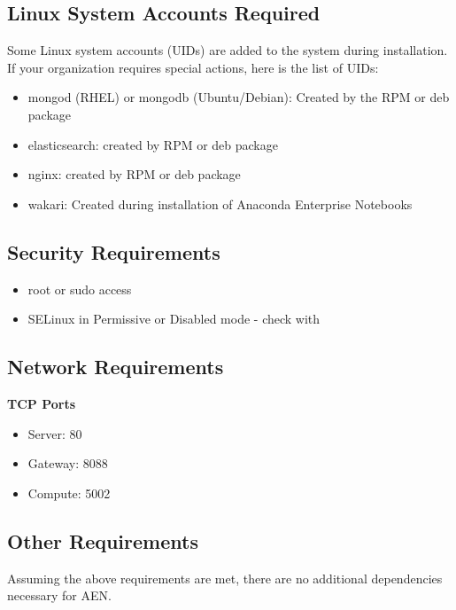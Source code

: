 \documentclass[letterpaper,10pt,openany,oneside]{sphinxmanual}
\begin{document}
\subsection{Linux System Accounts Required}
\label{AnacondaEnterpriseNotebooks:linux-system-accounts-required}
Some Linux system accounts (UIDs) are added to the system during installation.
If your organization requires special actions, here is the list of UIDs:
\begin{itemize}
\item {} 
mongod (RHEL) or mongodb (Ubuntu/Debian): Created by the RPM or deb package

\item {} 
elasticsearch: created by RPM or deb package

\item {} 
nginx: created by RPM or deb package

\item {} 
wakari: Created during installation of Anaconda Enterprise Notebooks

\end{itemize}


\subsection{Security Requirements}
\label{AnacondaEnterpriseNotebooks:security-requirements}\begin{itemize}
\item {} 
root or sudo access

\item {} 
SELinux in Permissive or Disabled mode - check with 

\end{itemize}


\subsection{Network Requirements}
\label{AnacondaEnterpriseNotebooks:network-requirements}
\textbf{TCP Ports}
\begin{itemize}
\item {} 
Server: 80

\item {} 
Gateway: 8088

\item {} 
Compute: 5002

\end{itemize}


\subsection{Other Requirements}
\label{AnacondaEnterpriseNotebooks:other-requirements}
Assuming the above requirements are met, there are no additional
dependencies necessary for AEN.
\end{document}
